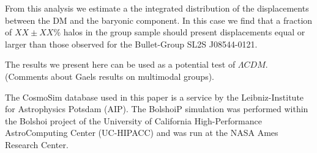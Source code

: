 \documentclass{emulateapj}
\newcommand{\bullg}{SL2S J08544-0121}
\begin{document}
From this analysis we estimate a the integrated distribution of the
displacements between the DM and the baryonic component. In this case
we find that a fraction of $XX \pm XX\%$ halos in the group sample
should present displacements equal or larger than those observed for
the Bullet-Group \bullg. 

The results we present here can be used as a potential test of
$\Lambda CDM$. (Comments about Gaels results on multimodal groups).


The CosmoSim database used in this paper is a service by the
Leibniz-Institute for Astrophysics Potsdam (AIP). The  BolshoiP
simulation was performed within the Bolshoi project of the University
of California High-Performance  AstroComputing Center (UC-HIPACC) and
was run at the NASA Ames Research Center. 



 
\end{document}
